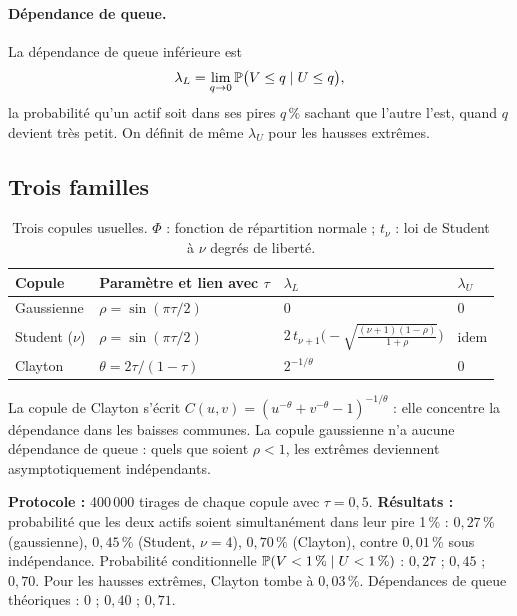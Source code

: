 \paragraph{Dépendance de queue.} La dépendance de queue inférieure est
\[
\lambda_L = \lim_{q\to0}\mathbb{P}\big(V\le q\mid U\le q\big),
\]
la probabilité qu'un actif soit dans ses pires $q\,\%$ sachant que l'autre l'est, quand $q$ devient très petit. On définit de même $\lambda_U$ pour les hausses extrêmes.

\subsection{Trois familles}

\begin{table}[h]
\centering\small
\caption{Trois copules usuelles. $\Phi$ : fonction de répartition normale ; $t_\nu$ : loi de Student à $\nu$ degrés de liberté.}
\label{c9:tab:families}
\begin{tabular}{llll}
\toprule
Copule & Paramètre et lien avec $\tau$ & $\lambda_L$ & $\lambda_U$ \\
\midrule
Gaussienne & $\rho = \sin(\pi\tau/2)$ & 0 & 0 \\
Student ($\nu$) & $\rho = \sin(\pi\tau/2)$ & $2\,t_{\nu+1}\!\Big(-\sqrt{\frac{(\nu+1)(1-\rho)}{1+\rho}}\Big)$ & idem \\
Clayton & $\theta = 2\tau/(1-\tau)$ & $2^{-1/\theta}$ & 0 \\
\bottomrule
\end{tabular}
\end{table}

La copule de Clayton s'écrit $C(u,v) = (u^{-\theta} + v^{-\theta} - 1)^{-1/\theta}$ : elle concentre la dépendance dans les baisses communes. La copule gaussienne n'a aucune dépendance de queue : quels que soient $\rho<1$, les extrêmes deviennent asymptotiquement indépendants.

\begin{codebox}
\textbf{Protocole :} 400\,000 tirages de chaque copule avec $\tau = 0{,}5$. \textbf{Résultats :} probabilité que les deux actifs soient simultanément dans leur pire 1\,\% : $0{,}27\,\%$ (gaussienne), $0{,}45\,\%$ (Student, $\nu = 4$), $0{,}70\,\%$ (Clayton), contre $0{,}01\,\%$ sous indépendance. Probabilité conditionnelle $\mathbb{P}(V<1\,\%\mid U<1\,\%)$ : $0{,}27$ ; $0{,}45$ ; $0{,}70$. Pour les hausses extrêmes, Clayton tombe à $0{,}03\,\%$. Dépendances de queue théoriques : 0 ; $0{,}40$ ; $0{,}71$.
\end{codebox}


